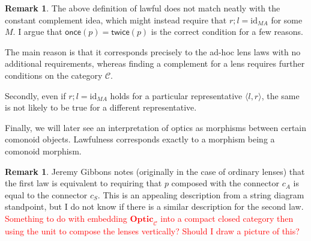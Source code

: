 \documentclass[11pt,a4paper]{article}
\theoremstyle{plain}
\theoremstyle{definition}
\newtheorem{remark}[theorem]{Remark}
\newcommand{\C}{\mathscr{C}}
\newcommand{\Optic}{\mathbf{Optic}}
\newcommand{\id}{\mathrm{id}}
\newcommand{\once}{\mathsf{once}}
\newcommand{\twice}{\mathsf{twice}}
\newcommand{\todo}[1]{\textcolor{red}{\small #1}}
\begin{document}
\begin{remark}
The above definition of lawful does not match neatly with the constant complement idea, which might instead require that $r;l = \id_{MA}$ for some $M$. I argue that $\once(p) = \twice(p)$ is the correct condition for a few reasons. 

The main reason is that it corresponds precisely to the ad-hoc lens laws with no additional requirements, whereas finding a complement for a lens requires further conditions on the category $\C$.

Secondly, even if $r;l = \id_{MA}$ holds for a particular representative $\langle l, r \rangle$, the same is not likely to be true for a different representative. 

Finally, we will later see an interpretation of optics as morphisms between certain comonoid objects. Lawfulness corresponds exactly to a morphism being a comonoid morphism.
\end{remark}

\begin{remark}
  Jeremy Gibbons notes (originally in the case of ordinary lenses) that the first law is equivalent to requiring that $p$ composed with the connector $c_A$ is equal to the connector $c_S$. This is an appealing description from a string diagram standpoint, but I do not know if there is a similar description for the second law. \todo{Something to do with embedding $\Optic_\C$ into a compact closed category then using the unit to compose the lenses vertically? Should I draw a picture of this?}
\end{remark}
\end{document}
